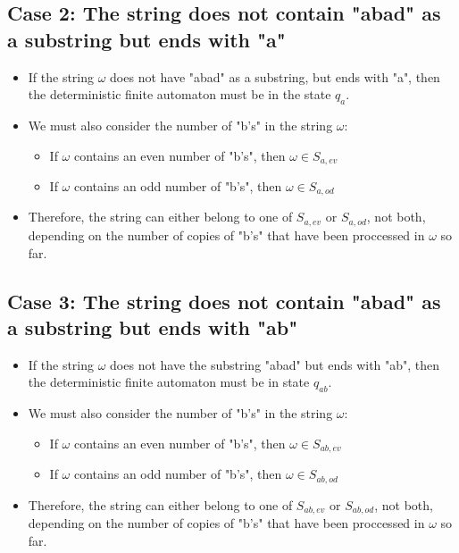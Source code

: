 \documentclass{article}
\begin{document}
\subsection*{Case 2: The string does not contain "abad" as a substring but ends with "a"}
\begin{itemize}
    \item If the string $\omega$ does not have "abad" as a substring, but ends with "a", then the deterministic finite automaton must be in the state $q_a$.
    \item We must also consider the number of "b's" in the string $\omega$:
    \begin{itemize}
        \item If $\omega$ contains an even number of "b's", then $\omega \in S_{a,ev}$
        \item If $\omega$ contains an odd number of "b's", then $\omega \in S_{a,od}$  
    \end{itemize}
    \item Therefore, the string can either belong to one of $S_{a,ev}$ or $S_{a,od}$, not both, depending on the number of copies of "b's" that have been proccessed in $\omega$ so far.
\end{itemize}

\subsection*{Case 3: The string does not contain "abad" as a substring but ends with "ab"}
\begin{itemize}
    \item If the string $\omega$ does not have the substring "abad" but ends with "ab", then the deterministic finite automaton must be in state $q_{ab}$.
    \item We must also consider the number of "b's" in the string $\omega$:
    \begin{itemize}
        \item If $\omega$ contains an even number of "b's", then $\omega \in S_{ab,ev}$
        \item If $\omega$ contains an odd number of "b's", then $\omega \in S_{ab,od}$  
    \end{itemize}
    \item Therefore, the string can either belong to one of $S_{ab,ev}$ or $S_{ab,od}$, not both, depending on the number of copies of "b's" that have been proccessed in $\omega$ so far.
\end{itemize}
\end{document}
